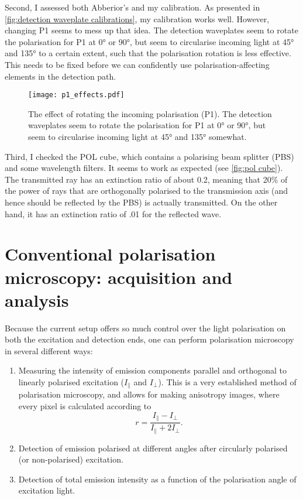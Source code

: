 Second, I assessed both Abberior's and my calibration. As presented in \autoref{fig:detection waveplate calibrations}, my calibration works well. However, changing P1 seems to mess up that idea. The detection waveplates seem to rotate the polarisation for P1 at \ang{0} or \ang{90}, but seem to circularise incoming light at \ang{45} and \ang{135} to a certain extent, such that the polarisation rotation is less effective. This needs to be fixed before we can confidently use polarisation-affecting elements in the detection path. 

\begin{figure}[h]
	\centering
	\texttt{[image: p1\_effects.pdf]}
	\caption{
		The effect of rotating the incoming polarisation (P1). The detection waveplates seem to rotate the polarisation for P1 at \ang{0} or \ang{90}, but seem to circularise incoming light at \ang{45} and \ang{135} somewhat.
	}
	\label{fig:p1 effects}
\end{figure}

Third, I checked the POL cube, which contains a polarising beam splitter (PBS) and some wavelength filters. It seems to work as expected (see \autoref{fig:pol cube}). The transmitted ray has an extinction ratio of about 0.2, meaning that 20\% of the power of rays that are orthogonally polarised to the transmission axis (and hence should be reflected by the PBS) is actually transmitted. On the other hand, it has an extinction ratio of .01 for the reflected wave.

\section{Conventional polarisation microscopy: acquisition and analysis}
\label{sec:pol analysis}
 
Because the current setup offers so much control over the light polarisation on both the excitation and detection ends, one can perform polarisation microscopy in several different ways:
\begin{enumerate}
	\item Measuring the intensity of emission components parallel and orthogonal to linearly polarised excitation ($ I_\parallel $ and $ I_\perp $). This is a very established method of polarisation microscopy, and allows for making anisotropy images, where every pixel is calculated according to
	\begin{equation}
		r=\frac{I_\parallel - I_\perp}{I_\parallel + 2I_\perp}.
	\end{equation}
	
	\item Detection of emission polarised at different angles after circularly polarised (or non-polarised) excitation.
	
	\item Detection of total emission intensity as a function of the polarisation angle of excitation light.
\end{enumerate}

